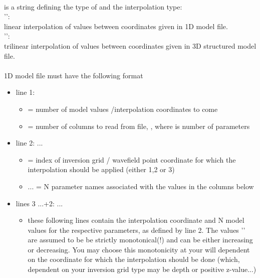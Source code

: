 \paragraph{}
 is a string defining the type of  and the interpolation type:\\
'':\\
linear interpolation of values between coordinates given in 1D model file.\\
'':\\
trilinear interpolation of values between coordinates given in 3D structured model file.\\
\\
1D model file must have the following format
\begin{itemize}
\item[]line 1:     
\begin{itemize}
\item[] = number of model values /interpolation coordinates to come
\item[] = number of columns to read from file, , where  is number of parameters
\end{itemize}
\item[]line 2:      ... 
\begin{itemize}
\item[] = index of inversion grid / wavefield point coordinate for which the interpolation should be applied (either 1,2 or 3)
\item[] ...  = N parameter names associated with the values in the columns below
\end{itemize}
\item[]lines 3 ...+2:    ... 
\begin{itemize}
\item[]these following  lines contain the interpolation coordinate and N model values for the respective parameters, as defined by line 2. The values '' are assumed to be be strictly monotonical(!) and can be either increasing or decreasing. You may choose this monotonicity at your will dependent on the coordinate for which the interpolation should be done (which, dependent on your inversion grid type may be depth or positive z-value...)
\end{itemize}
\end{itemize}
